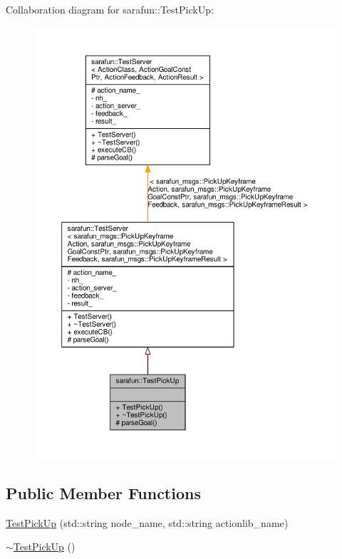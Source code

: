 Collaboration diagram for sarafun\-:\-:Test\-Pick\-Up\-:\nopagebreak
\begin{figure}[H]
\begin{center}
\leavevmode
\includegraphics[width=350pt]{db/dcf/classsarafun_1_1TestPickUp__coll__graph}
\end{center}
\end{figure}
\subsection*{Public Member Functions}
\begin{DoxyCompactItemize}
\item 
\hyperlink{classsarafun_1_1TestPickUp_a2d06467282615b0dc55e7d5e0602abf1_a2d06467282615b0dc55e7d5e0602abf1}{Test\-Pick\-Up} (std\-::string node\-\_\-name, std\-::string actionlib\-\_\-name)
\item 
\hyperlink{classsarafun_1_1TestPickUp_a4f2b56a24cc26f1224920e0e9aba67c3_a4f2b56a24cc26f1224920e0e9aba67c3}{$\sim$\-Test\-Pick\-Up} ()
\end{DoxyCompactItemize}

